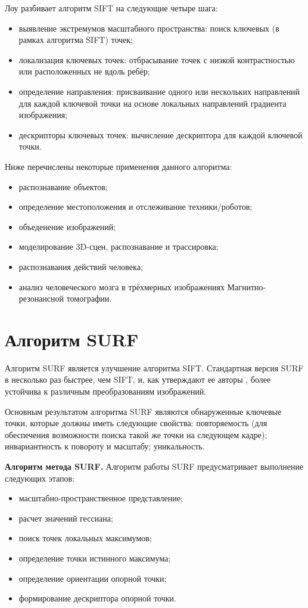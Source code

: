 Лоу разбивает алгоритм SIFT на следующие четыре шага:

\begin{itemize}
	\item выявление экстремумов масштабного пространства: поиск ключевых (в рамках алгоритма SIFT) точек;
	\item локализация ключевых точек: отбрасывание точек с низкой контрастностью или расположенных не вдоль ребёр;
	\item определение направления: присваивание одного или нескольких направлений для каждой ключевой точки на основе локальных направлений градиента изображения;
	\item дескрипторы ключевых точек: вычисление дескриптора для каждой ключевой точки.
\end{itemize}

Ниже перечислены некоторые применения данного алгоритма:

\begin{itemize}
	\item распознавание объектов;
	\item определение местоположения и отслеживание техники/роботов;
	\item объеденение изображений;
	\item моделирование 3D-сцен, распознавание и трассировка;
	\item распознавания действий человека;
	\item анализ человеческого мозга в трёхмерных изображениях Магнитно-резонансной томографии.
\end{itemize}

\section{Алгоритм SURF}
Алгоритм SURF является улучшение алгоритма SIFT. Стандартная версия SURF в несколько раз быстрее, чем SIFT, и, как утверждают ее авторы \cite{SURF}, более устойчива к различным преобразованиям изображений.

Основным результатом алгоритма SURF являются обнаруженные ключевые точки, которые должны иметь следующие свойства: повторяемость (для
обеспечения возможности поиска такой же точки на следующем кадре); инвариантность к повороту и масштабу; уникальность.

\textbf{Алгоритм метода SURF.} Алгоритм работы SURF предусматривает выполнение следующих этапов:

\begin{itemize}
	\item масштабно-пространственное представление;
	\item расчет значений гессиана;
	\item поиск точек локальных максимумов;
	\item определение точки истинного максимума;
	\item определение ориентации опорной точки;
	\item формирование дескриптора опорной точки.
\end{itemize}

